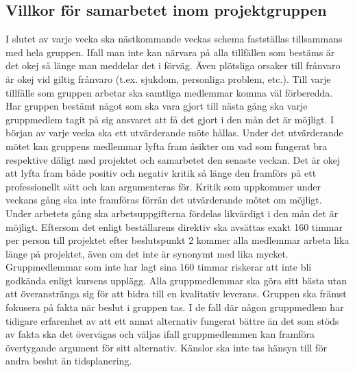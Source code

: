 \documentclass{article}
\begin{document}
\subsection{Villkor för samarbetet inom projektgruppen}

I slutet av varje vecka ska nästkommande veckas schema fastställas tillsammans med hela gruppen. Ifall man inte kan närvara på alla tillfällen som bestäms är det okej så länge man meddelar det i förväg. Även plötsliga orsaker till frånvaro är okej vid giltig frånvaro (t.ex. sjukdom, personliga problem, etc.).
\newline\newline
Till varje tillfälle som gruppen arbetar ska samtliga medlemmar komma väl förberedda. Har gruppen bestämt något som ska vara gjort till nästa gång ska varje gruppmedlem tagit på sig ansvaret att få det gjort i den mån det är möjligt.
\newline\newline
I början av varje vecka ska ett utvärderande möte hållas. Under det utvärderande mötet kan gruppens medlemmar lyfta fram åsikter om vad som fungerat bra respektive dåligt med projektet och samarbetet den senaste veckan. Det är okej att lyfta fram både positiv och negativ kritik så länge den framförs på ett professionellt sätt och kan argumenteras för. Kritik som uppkommer under veckans gång ska inte framföras förrän det utvärderande mötet om möjligt.
\newline\newline
Under arbetets gång ska arbetsuppgifterna fördelas likvärdigt i den mån det är möjligt. Eftersom det enligt beställarens direktiv ska avsättas exakt 160 timmar per person till projektet efter beslutspunkt 2 kommer alla medlemmar arbeta lika länge på projektet, även om det inte är synonymt med lika mycket. Gruppmedlemmar som inte har lagt sina 160 timmar riskerar att inte bli godkända enligt kursens upplägg.
\newline\newline
Alla gruppmedlemmar ska göra sitt bästa utan att överanstränga sig för att bidra till en kvalitativ leverans.
\newline\newline
Gruppen ska främst fokusera på fakta när beslut i gruppen tas. I de fall där någon gruppmedlem har tidigare erfarenhet av att ett annat alternativ fungerat bättre än det som stöds av fakta ska det övervägas och väljas ifall gruppmedlemmen kan framföra övertygande argument för sitt alternativ. Känslor ska inte tas hänsyn till för andra beslut än tidsplanering.
\end{document}

